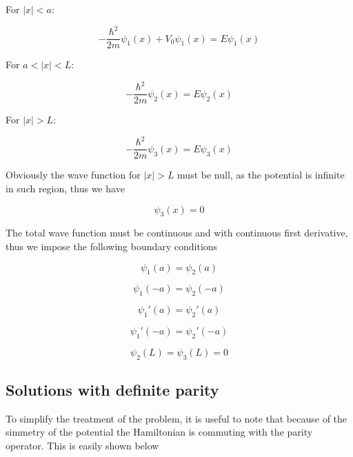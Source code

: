 \documentclass{article}
\begin{document}
For \(\left|x\right| < a\):

\begin{equation}
\label{eq:schr1}
-\frac{\hbar^2}{2m}\psi_{1}(x) + V_{0}\psi_{1}(x) = E\psi_{1}(x)
\end{equation}

For \(a < \left|x\right| < L\):

\begin{equation}
\label{eq:schr2}
-\frac{\hbar^2}{2m}\psi_{2}(x) = E\psi_{2}(x)
\end{equation}

For \(\left|x\right| > L\):

\begin{equation}
\label{eq:schr3}
-\frac{\hbar^2}{2m}\psi_{3}(x) = E\psi_{3}(x)
\end{equation}

Obviously the wave function for \(\left|x\right| > L\) must be null, as the potential is infinite in such region, thus we have

\begin{equation}
\psi_{3}(x) = 0
\end{equation}

The total wave function must be continuous and with continuous first derivative, thus we impose the following boundary conditions

\begin{equation}
\label{eq:continuity}
\psi_{1}(a) =  \psi_{2}(a)
\end{equation}

\begin{equation}
\psi_{1}(-a) =  \psi_{2}(-a)
\end{equation}

\begin{equation}
\label{eq:continuity_derivative}
\psi_{1}'(a) =  \psi_{2}'(a)
\end{equation}

\begin{equation}
\psi_{1}'(-a) =  \psi_{2}'(-a)
\end{equation}

\begin{equation}
\label{eq:null_bound}
\psi_{2}(L) =  \psi_{3}(L) = 0
\end{equation}

\subsection{Solutions with definite parity}
To simplify the treatment of the problem, it is useful to note that because of the simmetry of the potential the Hamiltonian is commuting with the parity operator. This is easily shown below
\end{document}
